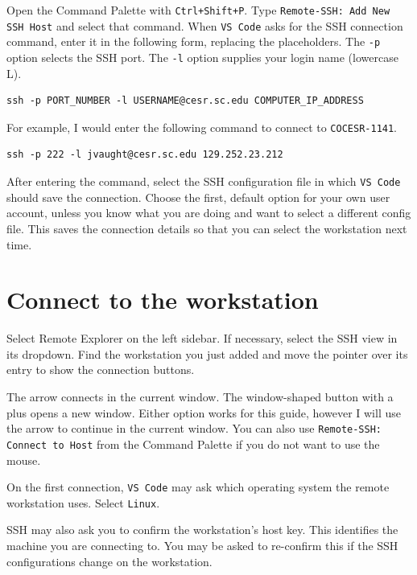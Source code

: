\documentclass[12pt]{article}
\newcommand{\keyshortcut}[1]{\begingroup\setlength{\fboxsep}{2pt}%
  \colorbox{ShortcutBackground}{\texttt{#1}}\endgroup}
\newcommand{\program}[1]{\begingroup\setlength{\fboxsep}{2pt}%
  \colorbox{ProgramBackground}{\texttt{#1}}\endgroup}
\newcommand{\inlinecode}[1]{\begingroup\setlength{\fboxsep}{2pt}%
  \colorbox{black!5}{\texttt{#1}}\endgroup}
\begin{document}
Open the Command Palette with \keyshortcut{Ctrl+Shift+P}. Type \inlinecode{Remote-SSH: Add New SSH Host} and select that command. When \program{VS Code} asks for the SSH connection command, enter it in the following form, replacing the placeholders. The \inlinecode{-p} option selects the SSH port. The \inlinecode{-l} option supplies your login name (lowercase L). 

\begin{lstlisting}
ssh -p PORT_NUMBER -l USERNAME@cesr.sc.edu COMPUTER_IP_ADDRESS
\end{lstlisting}



For example, I would enter the following command to connect to \inlinecode{COCESR-1141}.

\begin{lstlisting}
ssh -p 222 -l jvaught@cesr.sc.edu 129.252.23.212
\end{lstlisting}

After entering the command, select the SSH configuration file in which \program{VS Code} should save the connection. Choose the first, default option for your own user account, unless you know what you are doing and want to select a different config file. This saves the connection details so that you can select the workstation next time.


\section*{Connect to the workstation}

Select Remote Explorer on the left sidebar. If necessary, select the SSH view in its dropdown. Find the workstation you just added and move the pointer over its entry to show the connection buttons.

The arrow connects in the current window. The window-shaped button with a plus opens a new window. Either option works for this guide, however I will use the arrow to continue in the current window. You can also use \inlinecode{Remote-SSH: Connect to Host} from the Command Palette if you do not want to use the mouse. 

On the first connection, \program{VS Code} may ask which operating system the remote workstation uses. Select \program{Linux}.

SSH may also ask you to confirm the workstation's host key. This identifies the machine you are connecting to. You may be asked to re-confirm this if the SSH configurations change on the workstation.
\end{document}
